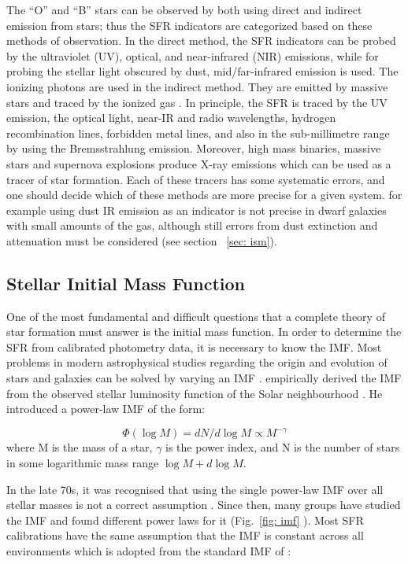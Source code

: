 The ``O'' and ``B'' stars can be observed by both using direct and indirect emission from stars; thus the SFR indicators are categorized based on these methods of observation. In the direct method, the SFR indicators can be probed by the ultraviolet (UV), optical, and near-infrared (NIR) emissions, while for probing the stellar light obscured by dust, mid/far-infrared emission is used. The ionizing photons are used in the indirect method. They are emitted by massive stars and traced by the ionized gas \citep[e.g.,][]{Calzetti04, Calzetti07}. In principle, the SFR is traced by the UV emission, the optical light, near-IR and radio wavelengths, hydrogen recombination lines, forbidden metal lines, and also in the sub-millimetre range by using the Bremsstrahlung emission. Moreover, high mass binaries, massive stars and supernova explosions produce X-ray emissions which can be used as a tracer of star formation. Each of these tracers has some systematic errors, and one should decide which of these methods are more precise for a given system. for example using dust IR emission as an indicator is not precise in dwarf galaxies with small amounts of the gas, although still errors from dust extinction and attenuation must be considered (see section ~\ref{sec: ism}).


\subsection{Stellar Initial Mass Function}
\label{sec: imf}
One of the most fundamental and difficult questions that a complete theory of star formation must answer is the initial mass function. In order to determine the SFR from calibrated photometry data, it is necessary to know the IMF. Most problems in modern astrophysical studies regarding the origin and evolution of stars and galaxies can be solved by varying an IMF \citep{Bastin10}. \cite{Salpeter55} empirically derived the IMF from the observed stellar luminosity function of the Solar neighbourhood \citep{Shu87}. He introduced a power-law IMF of the form:

\begin{equation}
\label{equ: salp}
\Phi (\log M) = dN / d \log M \propto M^{-\gamma }
\end{equation} 
where M is the mass of a star, $\gamma$ is the power index, and N is the number of stars in some logarithmic mass range $\log M + d\log M$. 

In the late 70s, it was recognised that using the single power-law IMF over all stellar masses is not a correct assumption \citep{Kroupa93, Bastin10}. Since then, many groups have studied the IMF and found different power laws for it (Fig.{~\ref{fig: imf}} ). Most SFR calibrations have the same assumption that the IMF is constant across all environments which is adopted from the standard IMF of \cite{Kroupa01}:

